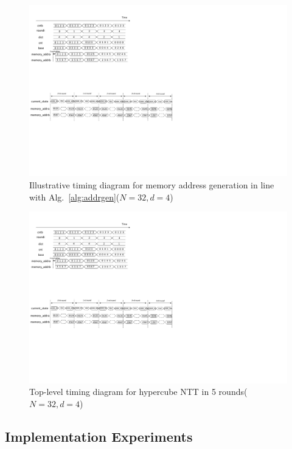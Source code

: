 \documentclass{iacrtrans}
\theoremstyle{plain}
\begin{document}
\begin{figure}[!tb]
\centering
\includegraphics[width=\textwidth]{./fig/timing_diag.pdf}
\caption{Illustrative timing diagram for memory address generation in line with Alg.~\ref{alg:addrgen}($N=32, d=4$)}\label{fig:timing_diag}
\end{figure}

\begin{figure}[!tb]
\centering
\includegraphics[width=\textwidth]{./fig/timing_diag2.pdf}
\caption{Top-level timing diagram for hypercube NTT in 5 rounds($N=32, d=4$)}\label{fig:timing_diag2}
\end{figure}


\subsection{Implementation Experiments}
\end{document}
